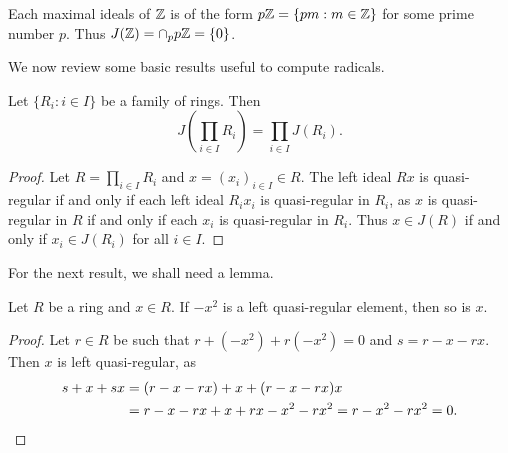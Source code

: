 \begin{example}
	Each maximal ideals of $\mathbb{Z}$ is of the form $p\mathbb{Z}=\{pm:m\in\mathbb{Z}\}$ for some prime number $p$. 
	Thus $J(\mathbb{Z})=\cap_p p\mathbb{Z}=\{0\}$.
\end{example}


We now review some basic results useful to compute radicals. 

\begin{proposition}
	Let $\{R_i:i\in I\}$ be a family of rings. Then 
	\[
	J\left(\prod_{i\in I}R_i\right)=\prod_{i\in I}J(R_i).
	\]
\end{proposition}

\begin{proof}
	Let $R=\prod_{i\in I}R_i$ and $x=(x_i)_{i\in I}\in R$.  The left ideal 
    $Rx$ is quasi-regular if and only if each left ideal $R_ix_i$
	is quasi-regular in $R_i$, as $x$ is quasi-regular in $R$ if and only if each 
	$x_i$ is quasi-regular in $R_i$. Thus $x\in J(R)$ if and only if $x_i\in
	J(R_i)$ for all $i\in I$.
\end{proof}

For the next result, we shall need a lemma.

\begin{lemma}
	\label{lemma:trickJ1}
	Let $R$ be a ring and $x\in R$. 
	If $-x^2$ is a left quasi-regular element, then so is $x$. 
\end{lemma}

\begin{proof}
	Let $r\in R$ be such that $r+(-x^2)+r(-x^2)=0$ and $s=r-x-rx$. Then
    $x$ is left quasi-regular, as 
    \begin{align*}
		s+x+sx&=(r-x-rx)+x+(r-x-rx)x\\
		&=r-x-rx+x+rx-x^2-rx^2=r-x^2-rx^2=0.\qedhere 
\end{align*}
\end{proof}

%

